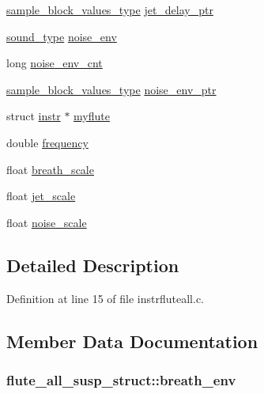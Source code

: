 \begin{DoxyCompactItemize}
\hyperlink{sound_8h_a83d17f7b465d1591f27cd28fc5eb8a03}{sample\+\_\+block\+\_\+values\+\_\+type} \hyperlink{structflute__all__susp__struct_a8a49584a9ea5f74e063c59eb93c2a324}{jet\+\_\+delay\+\_\+ptr}
\item 
\hyperlink{sound_8h_a792cec4ed9d6d636d342d9365ba265ea}{sound\+\_\+type} \hyperlink{structflute__all__susp__struct_a69664b776f66769c6a2729e260dc5d72}{noise\+\_\+env}
\item 
long \hyperlink{structflute__all__susp__struct_abdc33809090e6f61aedd009bc4010af6}{noise\+\_\+env\+\_\+cnt}
\item 
\hyperlink{sound_8h_a83d17f7b465d1591f27cd28fc5eb8a03}{sample\+\_\+block\+\_\+values\+\_\+type} \hyperlink{structflute__all__susp__struct_a4d6e28e3804b75e9ee1010cf8ba6524c}{noise\+\_\+env\+\_\+ptr}
\item 
struct \hyperlink{structinstr}{instr} $\ast$ \hyperlink{structflute__all__susp__struct_afbbb47728fdeef1ff3742735d7333539}{myflute}
\item 
double \hyperlink{structflute__all__susp__struct_a9f88ec7deb7b5e635f67f5a29a118fbf}{frequency}
\item 
float \hyperlink{structflute__all__susp__struct_ada85859b75f8467c32abe0d94e31a823}{breath\+\_\+scale}
\item 
float \hyperlink{structflute__all__susp__struct_a79fb495b7296408fc3e8dd8631a566be}{jet\+\_\+scale}
\item 
float \hyperlink{structflute__all__susp__struct_ae97f7d9063b1e5bcbaa6e5469b0d7029}{noise\+\_\+scale}
\end{DoxyCompactItemize}


\subsection{Detailed Description}


Definition at line 15 of file instrfluteall.\+c.



\subsection{Member Data Documentation}
\subsubsection[{\texorpdfstring{breath\+\_\+env}{breath_env}}]{ flute\+\_\+all\+\_\+susp\+\_\+struct\+::breath\+\_\+env}\hypertarget{structflute__all__susp__struct_afbe08c1b6541f6482034401882dbc6ee}{}\label{structflute__all__susp__struct_afbe08c1b6541f6482034401882dbc6ee}


